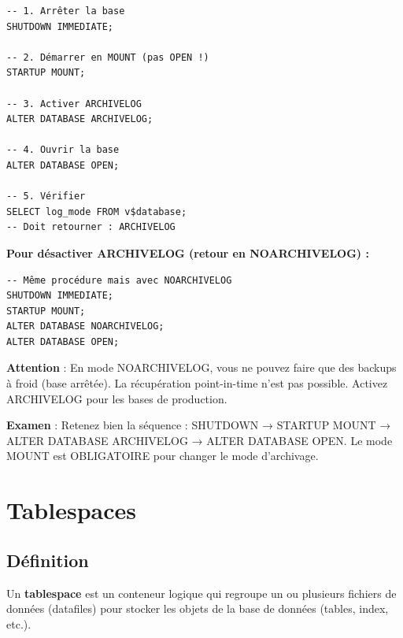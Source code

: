\documentclass[11pt,a4paper]{article}
\begin{document}
\begin{commandebox}
\begin{lstlisting}
-- 1. Arrêter la base
SHUTDOWN IMMEDIATE;

-- 2. Démarrer en MOUNT (pas OPEN !)
STARTUP MOUNT;

-- 3. Activer ARCHIVELOG
ALTER DATABASE ARCHIVELOG;

-- 4. Ouvrir la base
ALTER DATABASE OPEN;

-- 5. Vérifier
SELECT log_mode FROM v$database;
-- Doit retourner : ARCHIVELOG
\end{lstlisting}
\end{commandebox}

\textbf{Pour désactiver ARCHIVELOG (retour en NOARCHIVELOG) :}

\begin{commandebox}
\begin{lstlisting}
-- Même procédure mais avec NOARCHIVELOG
SHUTDOWN IMMEDIATE;
STARTUP MOUNT;
ALTER DATABASE NOARCHIVELOG;
ALTER DATABASE OPEN;
\end{lstlisting}
\end{commandebox}

\begin{dangerbox}
\textbf{Attention} : En mode NOARCHIVELOG, vous ne pouvez faire que des backups à froid (base arrêtée). La récupération point-in-time n'est pas possible. Activez ARCHIVELOG pour les bases de production.
\end{dangerbox}

\begin{tipbox}
\textbf{Examen} : Retenez bien la séquence : SHUTDOWN → STARTUP MOUNT → ALTER DATABASE ARCHIVELOG → ALTER DATABASE OPEN. Le mode MOUNT est OBLIGATOIRE pour changer le mode d'archivage.
\end{tipbox}

\section{Tablespaces}

\subsection{Définition}

\begin{definitionbox}
Un \textbf{tablespace} est un conteneur logique qui regroupe un ou plusieurs fichiers de données (datafiles) pour stocker les objets de la base de données (tables, index, etc.).
\end{definitionbox}
\end{document}
